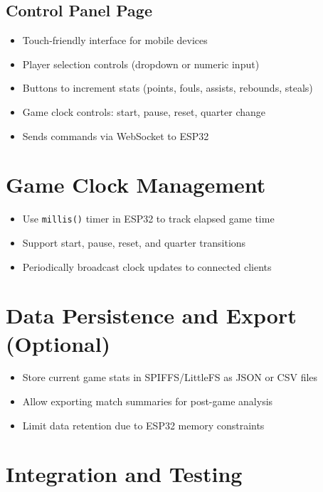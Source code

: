 \documentclass[a4paper,12pt]{article}
\begin{document}
\subsection{Control Panel Page}
\begin{itemize}[noitemsep]
    \item Touch-friendly interface for mobile devices
    \item Player selection controls (dropdown or numeric input)
    \item Buttons to increment stats (points, fouls, assists, rebounds, steals)
    \item Game clock controls: start, pause, reset, quarter change
    \item Sends commands via WebSocket to ESP32
\end{itemize}

\section{Game Clock Management}

\begin{itemize}[noitemsep]
    \item Use \texttt{millis()} timer in ESP32 to track elapsed game time
    \item Support start, pause, reset, and quarter transitions
    \item Periodically broadcast clock updates to connected clients
\end{itemize}

\section{Data Persistence and Export (Optional)}

\begin{itemize}[noitemsep]
    \item Store current game stats in SPIFFS/LittleFS as JSON or CSV files
    \item Allow exporting match summaries for post-game analysis
    \item Limit data retention due to ESP32 memory constraints
\end{itemize}

\section{Integration and Testing}
\end{document}
